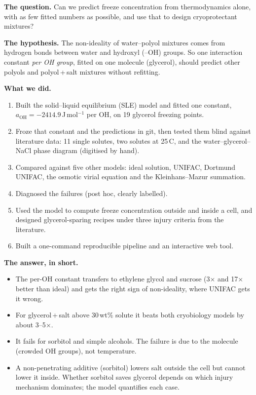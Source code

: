\documentclass[11pt,a4paper]{article}
\newcommand{\aoh}{a_{\mathrm{OH}}}
\begin{document}
\textbf{The question.} Can we predict freeze concentration from thermodynamics alone, with as few fitted numbers as
possible, and use that to design cryoprotectant mixtures?

\textbf{The hypothesis.} The non-ideality of water--polyol mixtures comes from hydrogen bonds between water and
hydroxyl (--OH) groups. So one interaction constant \emph{per OH group}, fitted on one molecule (glycerol), should
predict other polyols and polyol\,+\,salt mixtures without refitting.

\textbf{What we did.}
\begin{enumerate}
\item Built the solid--liquid equilibrium (SLE) model and fitted one constant, $\aoh=-2414.9$\,J\,mol$^{-1}$ per OH,
on 19 glycerol freezing points.
\item Froze that constant and the predictions in git, then tested them blind against literature data: 11 single
solutes, two solutes at 25\,\textdegree C, and the water--glycerol--NaCl phase diagram (digitised by hand).
\item Compared against five other models: ideal solution, UNIFAC, Dortmund UNIFAC, the osmotic virial equation and
the Kleinhans--Mazur summation.
\item Diagnosed the failures (post hoc, clearly labelled).
\item Used the model to compute freeze concentration outside and inside a cell, and designed glycerol-sparing
recipes under three injury criteria from the literature.
\item Built a one-command reproducible pipeline and an interactive web tool.
\end{enumerate}

\textbf{The answer, in short.}
\begin{itemize}
\item The per-OH constant transfers to ethylene glycol and sucrose (3$\times$ and 17$\times$ better than ideal) and
gets the right sign of non-ideality, where UNIFAC gets it wrong.
\item For glycerol\,+\,salt above 30\,wt\% solute it beats both cryobiology models by about 3--5$\times$.
\item It fails for sorbitol and simple alcohols. The failure is due to the molecule (crowded OH groups), not
temperature.
\item A non-penetrating additive (sorbitol) lowers salt outside the cell but cannot lower it inside. Whether sorbitol
saves glycerol depends on which injury mechanism dominates; the model quantifies each case.
\end{itemize}
\end{document}
